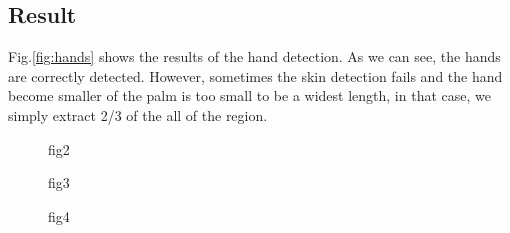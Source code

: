 \subsection{Result}
Fig.\ref{fig:hands} shows the results of the hand detection.
As we can see, the hands are correctly detected.
However, sometimes the skin detection fails and the hand become smaller of the palm is too small to be a widest length, in that case, we simply extract 2/3 of the all of the region.

\begin{figure}[htbp]
 \centering
 
 \caption{fig2}
\end{figure}

\begin{figure}[htbp]
 \centering
 
 \caption{fig3}
\end{figure}

\begin{landscape}
\begin{figure}[htbp]
 \centering
 
 \caption{fig4}
\end{figure}
\end{landscape}
